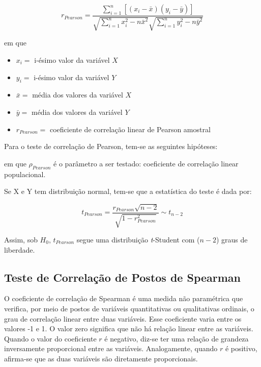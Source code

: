 \documentclass[
]{estat/estat}
\begin{document}
\[r_{Pearson} = \frac{\displaystyle \sum_{i=1}^{n} \left [ \left(x_i-\bar{x}\right) \left(y_i-\bar{y}\right) \right]}{\sqrt{\displaystyle \sum_{i=1}^{n} x_i^2 - n\bar{x}^2} \sqrt{\displaystyle \sum_{i=1}^{n} y_i^2 - n\bar{y}^2}}\]

\noindent em que

\begin{itemize}
\item
  \(x_i=\) i-ésimo valor da variável \(X\)
\item
  \(y_i=\) i-ésimo valor da variável \(Y\)
\item
  \(\bar{x}=\) média dos valores da variável \(X\)
\item
  \(\bar{y}=\) média dos valores da variável \(Y\)
\item
  \(r_{Pearson}=\) coeficiente de correlação linear de Pearson amostral
\end{itemize}

Para o teste de correlação de Pearson, tem-se as seguintes hipóteses:


em que \(\rho_{Pearson}\) é o parâmetro a ser testado: coeficiente de
correlação linear populacional.

Se X e Y tem distribuição normal, tem-se que a estatística do teste é
dada por:

\[t_{Pearson} = \frac{r_{Pearson} \sqrt{n-2}}{\sqrt{1-r_{Pearson}^2}} \sim t_{n-2} \]

Assim, sob \(H_{0}\), \(t_{Pearson}\) segue uma distribuição
\textit{t}-Student com (\(n - 2\)) graus de liberdade.

\subsection{Teste de Correlação de Postos de
Spearman}\label{teste-de-correlauxe7uxe3o-de-postos-de-spearman}

O coeficiente de correlação de Spearman é uma medida não paramétrica que
verifica, por meio de postos de variáveis quantitativas ou qualitativas
ordinais, o grau de correlação linear entre duas variáveis. Esse
coeficiente varia entre os valores -1 e 1. O valor zero significa que
não há relação linear entre as variáveis. Quando o valor do coeficiente
\(r\) é negativo, diz-se ter uma relação de grandeza inversamente
proporcional entre as variáveis. Analogamente, quando \(r\) é positivo,
afirma-se que as duas variáveis são diretamente proporcionais.
\end{document}
